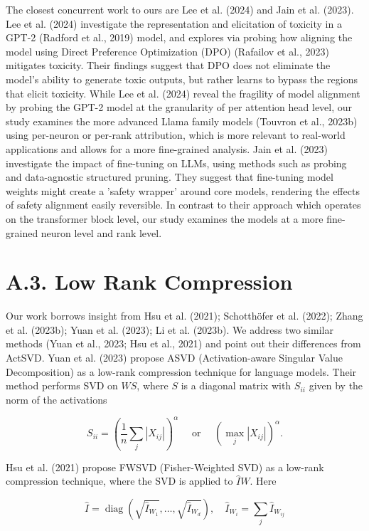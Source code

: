 \documentclass[10pt]{article}
\begin{document}
The closest concurrent work to ours are Lee et al. (2024) and Jain et al. (2023). Lee et al. (2024) investigate the representation and elicitation of toxicity in a GPT-2 (Radford et al., 2019) model, and explores via probing how aligning the model using Direct Preference Optimization (DPO) (Rafailov et al., 2023) mitigates toxicity. Their findings suggest that DPO does not eliminate the model's ability to generate toxic outputs, but rather learns to bypass the regions that elicit toxicity. While Lee et al. (2024) reveal the fragility of model alignment by probing the GPT-2 model at the granularity of per attention head level, our study examines the more advanced Llama family models (Touvron et al., 2023b) using per-neuron or per-rank attribution, which is more relevant to real-world applications and allows for a more fine-grained analysis. Jain et al. (2023) investigate the impact of fine-tuning on LLMs, using methods such as probing and data-agnostic structured pruning. They suggest that fine-tuning model weights might create a 'safety wrapper' around core models, rendering the effects of safety alignment easily reversible. In contrast to their approach which operates on the transformer block level, our study examines the models at a more fine-grained neuron level and rank level.

\section*{A.3. Low Rank Compression}
Our work borrows insight from Hsu et al. (2021); Schotthöfer et al. (2022); Zhang et al. (2023b); Yuan et al. (2023); Li et al. (2023b). We address two similar methods (Yuan et al., 2023; Hsu et al., 2021) and point out their differences from ActSVD. Yuan et al. (2023) propose ASVD (Activation-aware Singular Value Decomposition) as a low-rank compression technique for language models. Their method performs SVD on $W S$, where $S$ is a diagonal matrix with $S_{i i}$ given by the norm of the activations

$$
S_{i i}=\left(\frac{1}{n} \sum_{j}\left|X_{i j}\right|\right)^{\alpha} \quad \text { or } \quad\left(\max _{j}\left|X_{i j}\right|\right)^{\alpha} .
$$

Hsu et al. (2021) propose FWSVD (Fisher-Weighted SVD) as a low-rank compression technique, where the SVD is applied to $\hat{I} W$. Here

$$
\hat{I}=\operatorname{diag}\left(\sqrt{\hat{I}_{W_{1}}}, \ldots, \sqrt{\hat{I}_{W_{d}}}\right), \quad \hat{I}_{W_{i}}=\sum_{j} \hat{I}_{W_{i j}}
$$
\end{document}

